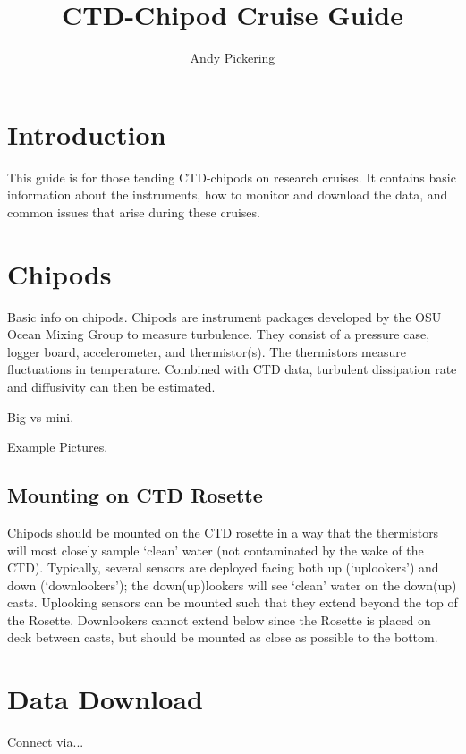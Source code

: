 \documentclass[11pt]{article}
\title{CTD-Chipod Cruise Guide}
\author{Andy Pickering}
\date{}                                           %
\begin{document}
\maketitle

\tableofcontents
\newpage


\section{Introduction}

This guide is for those tending CTD-chipods on research cruises. It contains basic information about the instruments, how to monitor and download the data, and common issues that arise during these cruises. 

\section{Chipods}

Basic info on chipods. Chipods are instrument packages developed by the OSU Ocean Mixing Group to measure turbulence. They consist of a pressure case, logger board, accelerometer, and thermistor(s). The thermistors measure fluctuations in temperature. Combined with CTD data, turbulent dissipation rate and diffusivity can then be estimated. 

Big vs mini. 

Example Pictures.

\subsection{Mounting on CTD Rosette}

Chipods should be mounted on the CTD rosette in a way that the thermistors will most closely sample `clean' water (not contaminated by the wake of the CTD). Typically, several sensors are deployed facing both up (`uplookers') and down (`downlookers'); the down(up)lookers will see `clean' water on the down(up) casts. Uplooking sensors can be mounted such that they extend beyond the top of the Rosette. Downlookers cannot extend below since the Rosette is placed on deck between casts, but should be mounted as close as possible to the bottom. 

\section{Data Download}

Connect via...
\end{document}

